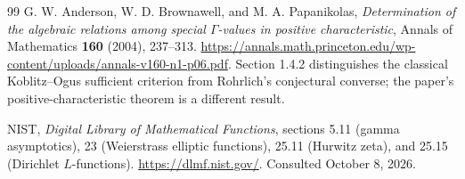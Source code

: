\begin{thebibliography}{99}
G. W. Anderson, W. D. Brownawell, and M. A. Papanikolas,
\emph{Determination of the algebraic relations among special
\(\Gamma\)-values in positive characteristic},
Annals of Mathematics \textbf{160} (2004), 237--313.
\url{https://annals.math.princeton.edu/wp-content/uploads/annals-v160-n1-p06.pdf}.
Section 1.4.2 distinguishes the classical Koblitz--Ogus sufficient
criterion from Rohrlich's conjectural converse; the paper's
positive-characteristic theorem is a different result.

NIST, \emph{Digital Library of Mathematical Functions},
sections 5.11 (gamma asymptotics), 23 (Weierstrass elliptic
functions), 25.11 (Hurwitz zeta), and 25.15 (Dirichlet \(L\)-functions).
\url{https://dlmf.nist.gov/}.
Consulted October 8, 2026.

\end{thebibliography}

